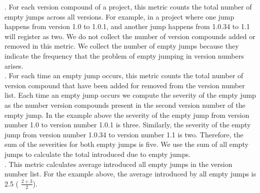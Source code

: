 \documentclass[conference]{IEEEtran}
\begin{document}
.  For each version compound of a project, this metric counts the total number of empty jumps across all versions. For example, in a project where one jump happens from version 1.0 to 1.0.1, and another jump happens from 1.0.34 to 1.1 will register as two.
We do not collect the number of version compounds added or removed in this metric.
We collect the number of empty jumps because they indicate the frequency that the problem of empty jumping in version numbers arises. \\

.  For each time an empty jump occurs, this metric counts the total number of version compound that have been added for removed from the version number list. 
Each time an empty jump occurs we compute the severity of the empty jump as the number version compounds present in the second version number of the empty jump.
In the example above the severity of the empty jump from version number 1.0 to version number 1.0.1 is three.
Similarly, the severity of the empty jump from version number 1.0.34 to version number 1.1 is two.
Therefore, the sum of the severities for both empty jumps is five.
We use the sum of all empty jumps to calculate the total \numberchoices introduced due to empty jumps. \\

 
. 
This metric calculates average \numberchoices introduced all empty jumps in the version number list. For the example above, the average \numberchoices introduced by all empty jumps is 2.5 ( $\frac{ 2 + 3}{2}$).
 \\
\end{document}
